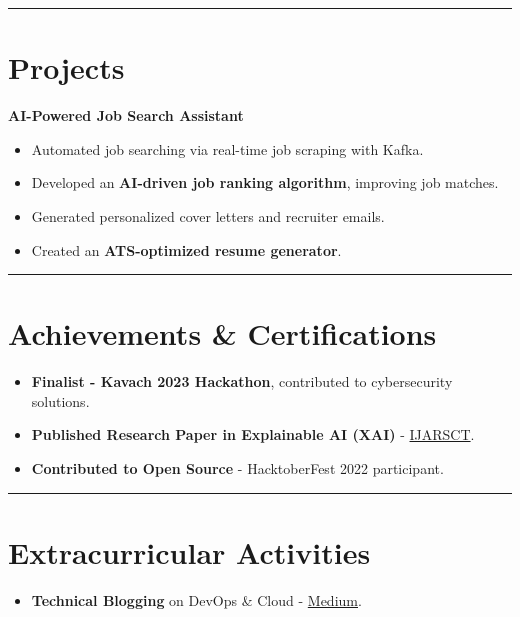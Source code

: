 \documentclass[a4paper,10pt]{article}
\begin{document}
\hrule
\section*{Projects}
\textbf{AI-Powered Job Search Assistant}
\begin{itemize}
    \item Automated job searching via real-time job scraping with Kafka.
    \item Developed an \textbf{AI-driven job ranking algorithm}, improving job matches.
    \item Generated personalized cover letters and recruiter emails.
    \item Created an \textbf{ATS-optimized resume generator}.
\end{itemize}

\vspace{3pt}

\hrule
\vspace{3pt}

\section*{Achievements \& Certifications}
\begin{itemize}
    \item \textbf{Finalist - Kavach 2023 Hackathon}, contributed to cybersecurity solutions.
    \item \textbf{Published Research Paper in Explainable AI (XAI)} - \href{https://ijarsct.co.in/Paper18344.pdf}{IJARSCT}.
    \item \textbf{Contributed to Open Source} - HacktoberFest 2022 participant.
\end{itemize}

\hrule
\vspace{3pt}

\section*{Extracurricular Activities}
\begin{itemize}
    \item \textbf{Technical Blogging} on DevOps \& Cloud - \href{https://medium.com/@yash.7232.rajput}{Medium}.
\end{itemize}
\end{document}
